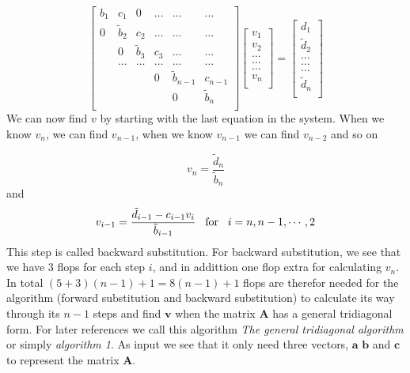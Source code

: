 \documentclass[11pt]{article}
\begin{document}
\[
\begin{bmatrix}
    b_1 & c_1 & 0   &\dots & \dots & \dots \\
    0 & \tilde{b}_2 & c_2 & \dots& \dots & \dots \\
        & 0 & \tilde{b}_3 & c_3  & \dots & \dots \\
        &\dots&\dots &\dots  &\dots & \dots \\
     & &  &0 &\tilde{b}_{n-1} &c_{n-1} \\
     &    &  &  & 0 & \tilde{b}_n \\
\end{bmatrix}
\begin{bmatrix}
      v_1\\
      v_2\\
      \dots \\
      \dots  \\
      \dots \\
      v_n\\
\end{bmatrix}
=\begin{bmatrix}
      d_1\\
      \tilde{d}_2\\
      \dots \\
      \dots \\
      \dots \\
      \tilde{d}_n\\
\end{bmatrix}
\]
We can now find $v$ by starting with the last equation in the system. When we know $v_n$, we
can find $v_{n-1}$, when we know $v_{n-1}$ we can find $v_{n-2}$ and so on
    
\begin{equation*}
v_n = \frac{\tilde{d}_n}{\tilde{b}_n}
\end{equation*}
and
\begin{equation*}
v_{i-1} = \frac{\tilde{d}_{i-1}-c_{i-1}v_i}{\tilde{b}_{i-1}}
\hspace{0.3cm} \text{for} \hspace{0.3cm} i = n, n-1, \cdots, 2  
\end{equation*}
This step is called backward substitution. For backward substitution, we see that we have 3 flops 
for each step $i$, and in addittion one flop extra
for calculating $v_n$. In total $(5+3)(n-1) + 1 = 8(n-1) + 1$ flops are therefor needed for 
the algorithm (forward substitution and backward substitution) to
calculate its way through its $n-1$ steps and find $\mathbf{v}$ when the matrix $\mathbf{A}$ has a
general tridiagonal form.
For later references we call this algorithm 
\emph{The general tridiagonal algorithm} or simply \emph{algorithm 1}. As input we see
that it only need three vectors, $\mathbf a$ $\mathbf b$ and $\mathbf c$ to represent
the matrix $\mathbf A$.
\end{document}
